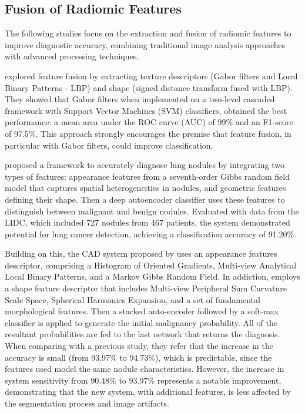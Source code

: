 \subsection{Fusion of Radiomic Features}

The following studies focus on the extraction and fusion of radiomic features to improve diagnostic accuracy, combining traditional image analysis approaches with advanced processing techniques. 

\citet{Farag2017} explored feature fusion by extracting texture descriptors (Gabor filters and Local Binary Patterns - LBP) and shape (signed distance transform fused with LBP). They showed that Gabor filters when implemented on a two-level cascaded framework with Support Vector Machines (SVM) classifiers, obtained the best performance: a mean area under the ROC curve (AUC) of 99\% and an F1-score of 97.5\%. This approach strongly encourages the premise that feature fusion, in particular with Gabor filters, could improve classification.

\citet{Shaffie2018} proposed a framework to accurately diagnose lung nodules by integrating two types of features: appearance features from a seventh-order Gibbs random field model that captures spatial heterogeneities in nodules, and geometric features defining their shape. Then a deep autoencoder classifier uses these features to distinguish between malignant and benign nodules. Evaluated with data from the LIDC, which included 727 nodules from 467 patients, the system demonstrated potential for lung cancer detection, achieving a classification accuracy of 91.20\%.

Building on this, the CAD system proposed by \citet{Shaffie2022} uses an appearance features descriptor, comprising a Histogram of Oriented Gradients, Multi-view Analytical Local Binary Patterns, and a Markov Gibbs Random Field. In addiction, employs a shape feature descriptor that includes Multi-view Peripheral Sum Curvature Scale Space, Spherical Harmonics Expansion, and a set of fundamental morphological features. Then a stacked auto-encoder followed by a soft-max classifier is applied to generate the initial malignancy probability. All of the resultant probabilities are fed to the last network that returns the diagnosis. When comparing with a previous study, they refer that the increase in the accuracy is small (from 93.97\% to 94.73\%), which is predictable, since the features used model the same nodule characteristics. However, the increase in system sensitivity from 90.48\% to 93.97\% represents a notable improvement, demonstrating that the new system, with additional features, is less affected by the segmentation process and image artifacts.

